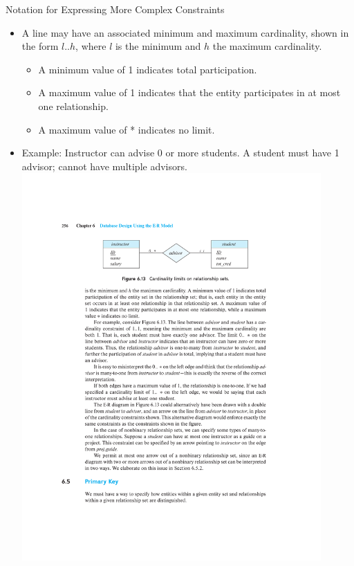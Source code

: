 \documentclass{beamer}
\begin{document}
\begin{frame}{Notation for Expressing More Complex Constraints}
    \begin{itemize}
        \item A line may have an associated minimum and maximum cardinality, shown in the form $l..h$, where $l$ is the minimum and $h$ the maximum cardinality.
        \begin{itemize}
            \item A minimum value of 1 indicates total participation.
            \item A maximum value of 1 indicates that the entity participates in at most one relationship.
            \item A maximum value of * indicates no limit.
        \end{itemize}
        \item Example: Instructor can advise 0 or more students. A student must have 1 advisor; cannot have multiple advisors.
            \includegraphics[trim={5cm 21cm 5cm 4.25cm}, clip, width=0.9\textwidth]{figures/p256}
    \end{itemize}
\end{frame}
\end{document}
